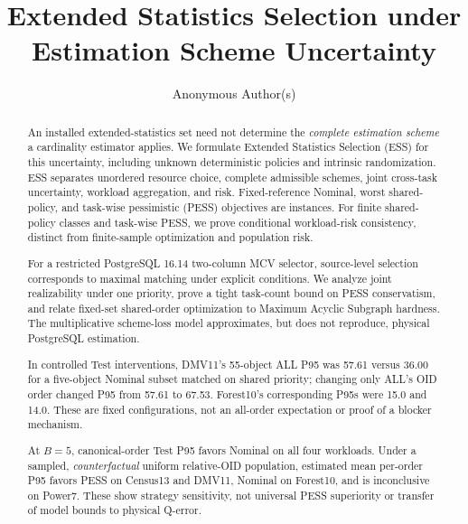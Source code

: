 \documentclass[sigconf, nonacm]{acmart}
\begin{document}
\title{Extended Statistics Selection under Estimation Scheme Uncertainty}
\author{Anonymous Author(s)}

\begin{abstract}
An installed extended-statistics set need not determine the
\emph{complete estimation scheme} a cardinality estimator applies.
We formulate Extended Statistics Selection (ESS) for this
uncertainty, including unknown deterministic policies and intrinsic
randomization. ESS separates unordered resource choice, complete
admissible schemes, joint cross-task uncertainty, workload
aggregation, and risk. Fixed-reference Nominal, worst shared-policy,
and task-wise pessimistic (PESS) objectives are instances. For finite
shared-policy classes and task-wise PESS, we prove conditional
workload-risk consistency, distinct from finite-sample optimization
and population risk.

For a restricted PostgreSQL 16.14 two-column MCV selector, source-level
selection corresponds to maximal matching under explicit conditions.
We analyze joint realizability under one priority, prove a tight
task-count bound on PESS conservatism, and relate fixed-set shared-order
optimization to Maximum Acyclic Subgraph hardness. The multiplicative
scheme-loss model approximates, but does not reproduce, physical
PostgreSQL estimation.

In controlled Test interventions, DMV11's 55-object ALL P95 was
57.61 versus 36.00 for a five-object Nominal subset matched on shared
priority; changing only ALL's OID order changed P95 from 57.61 to
67.53. Forest10's corresponding P95s were 15.0 and 14.0. These are
fixed configurations, not an all-order expectation or proof of a
blocker mechanism.

At \(B=5\), canonical-order Test P95 favors Nominal on all four
workloads. Under a sampled, \emph{counterfactual} uniform relative-OID
population, estimated mean per-order P95 favors PESS on Census13 and
DMV11, Nominal on Forest10, and is inconclusive on Power7. These show
strategy sensitivity, not universal PESS superiority or transfer of
model bounds to physical Q-error.
\end{abstract}

\maketitle

\vldbtopmatter
\end{document}
